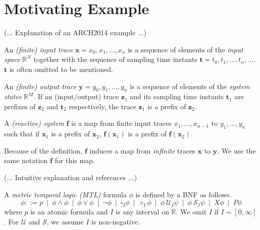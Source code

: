 \section{Motivating Example}\label{sec:example}

(... Explanation of an ARCH2014 example ...)

\begin{definition}[System]
  An \emph{(finite) input trace} $\mathbf{x} = x_0, x_1, \ldots, x_n$ is a sequence of elements of the \emph{input space} $\mathbb R^N$ together with the sequence of sampling time instants $\mathbf{t} = t_0, t_1, \ldots, t_n, \ldots$.
  $\mathbf{t}$ is often omitted to be mentioned.

  An \emph{(finite) output trace} $\mathbf{y} = y_0, y_1, \ldots, y_n$ is a sequence of elements of the \emph{system states} $\mathbb R^M$.
  If an (input/output) trace $\mathbf{z}_1$ and its sampling time instants $\mathbf{t}_1$ are prefixes of $\mathbf{z}_2$ and $\mathbf{t}_2$ respectively, the trace $\mathbf{z}_1$ is a prefix of $\mathbf{z}_2$.

  A \emph{(reactive) system} $\mathbf{f}$ is a map from finite input traces $x_1, \ldots, x_{n-1}$ to $y_1, \ldots, y_n$ such that if $\mathbf{x}_1$ is a prefix of $\mathbf{x}_2$, $\mathbf{f}(\mathbf{x}_1)$ is a prefix of $\mathbf{f}(\mathbf{x}_2)$.
\end{definition}

Because of the definition, $\mathbf{f}$ induces a map from \emph{infinite} traces $\mathbf{x}$ to $\mathbf{y}$.
We use the same notation $\mathbf{f}$ for this map.

(... Intuitive explanation and references ...)
\begin{definition}
  A \emph{metric temporal logic (MTL)} formula $\phi$ is defined by a BNF as follows.
  \begin{equation}
    \phi ::= p \ \mid\  \phi \wedge \phi \ \mid\ \phi \vee \phi \ \mid \ \neg \phi \ \mid\  \square_I \phi \ \mid\ \diamond_I \phi \ \mid\ \phi \ \mathcal{U}_I \psi \ \mid\ \phi \ \mathcal{S}_I \psi \ \mid\ X\phi \ \mid\ P\phi
  \end{equation}
  where $p$ is an atomic formula and $I$ is any interval on $\mathbb R$.
  We omit $I$ if $I = [0, \infty]$.
  For $\mathcal{U}$ and $\mathcal{S}$, we assume $I$ is non-negative.
\end{definition}

